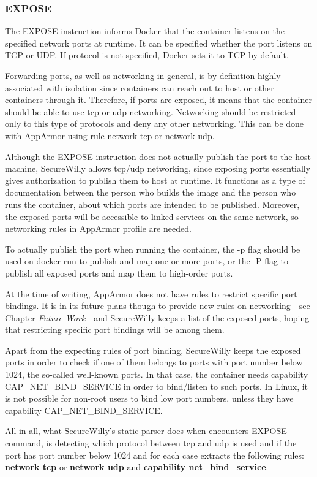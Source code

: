 \subsubsection{EXPOSE}
The EXPOSE instruction informs Docker that the container listens on the specified network ports at runtime. It can be specified whether the port listens on TCP or UDP. If protocol is not specified, Docker sets it to TCP by default.

Forwarding ports, as well as networking in general, is by definition highly associated with isolation since containers can reach out to host or other containers through it. Therefore, if ports are exposed, it means that the container should be able to use tcp or udp networking. Networking should be restricted only to this type of protocols and deny any other networking. This can be done with AppArmor using rule network tcp or network udp.

Although the EXPOSE instruction does not actually publish the port to the host machine, SecureWilly allows tcp/udp networking, since exposing ports essentially gives authorization to publish them to host at runtime. It functions as a type of documentation between the person who builds the image and the person who runs the container, about which ports are intended to be published. Moreover, the exposed ports will be accessible to linked services on the same network, so networking rules in AppArmor profile are needed.

To actually publish the port when running the container, the -p flag should be used on docker run to publish and map one or more ports, or the -P flag to publish all exposed ports and map them to high-order ports.

At the time of writing, AppArmor does not have rules to restrict specific port bindings. It is in its future plans though to provide new rules on networking - see Chapter \textit{Future Work} - and SecureWilly keeps a list of the exposed ports, hoping that restricting specific port bindings will be among them. 

Apart from the expecting rules of port binding, SecureWilly keeps the exposed ports in order to check if one of them belongs to ports with port number below 1024, the so-called well-known ports. In that case, the container needs capability CAP\_NET\_BIND\_SERVICE in order to bind/listen to such ports. In Linux, it is not possible for non-root users to bind low port numbers, unless they have capability CAP\_NET\_BIND\_SERVICE.

All in all, what SecureWilly's static parser does when encounters EXPOSE command, is detecting which protocol between tcp and udp is used and if the port has port number below 1024 and for each case extracts the following rules: \textbf{network tcp} or \textbf{network udp} and \textbf{capability net\_bind\_service}.

